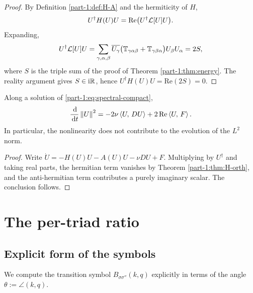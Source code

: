 \begin{proof}
By Definition \ref{part-1:def:H-A} and the hermiticity of $H$,
\begin{equation*}
U^\dagger H(U) U 
= \mathrm{Re}\bigl(U^\dagger \mathcal{L}[U] U\bigr).
\end{equation*}
Expanding,
\begin{equation*}
U^\dagger \mathcal{L}[U] U 
= \sum_{\gamma,\alpha,\beta} \overline{U_\gamma}
\bigl(\mathbb{T}_{\gamma\alpha\beta} + \mathbb{T}_{\gamma\beta\alpha}\bigr) U_\beta U_\alpha
= 2S,
\end{equation*}
where $S$ is the triple sum of the proof of Theorem \ref{part-1:thm:energy}. 
The reality argument gives $S\in\mathrm{i}\mathbb{R}$, hence 
$U^\dagger H(U) U = \mathrm{Re}(2S) = 0$.
\end{proof}

\begin{corollary}\label{part-1:cor:balance}
Along a solution of \eqref{part-1:eq:spectral-compact},
\begin{equation}\label{part-1:eq:balance}
\frac{\,\mathrm{d}}{\,\mathrm{d} t}\left\lVert U \right\rVert^2 
= -2\nu\left\langle U,\, DU \right\rangle + 2\,\mathrm{Re}\left\langle U,\, F \right\rangle.
\end{equation}
In particular, the nonlinearity does not contribute to the evolution 
of the $L^2$ norm.
\end{corollary}

\begin{proof}
Write $\dot U = -H(U)U - A(U)U - \nu DU + F$. Multiplying by 
$U^\dagger$ and taking real parts, the hermitian term vanishes by 
Theorem \ref{part-1:thm:H-orth}, and the anti-hermitian term contributes a 
purely imaginary scalar. The conclusion follows.
\end{proof}

\section{The per-triad ratio}\label{part-1:sec:triad}

\subsection{Explicit form of the symbols}
\label{part-1:ssec:symbols-explicit}

We compute the transition symbol $B_{\sigma\sigma''}(k,q)$ explicitly 
in terms of the angle $\theta := \angle(k,q)$.

